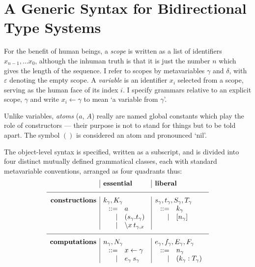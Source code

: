 \documentclass{jfp1}
\newcommand{\emp}{\varepsilon}
\begin{document}
\section{A Generic Syntax for Bidirectional Type Systems}

\newcommand{\from}{\leftarrow}
\newcommand{\la}[1]{\backslash #1\:}

For the benefit of human beings, a \emph{scope} is written as a list of identifiers $x_{n-1},\ldots x_0$, although the inhuman truth is that it is just the number $n$
which gives the length of the sequence. I refer to scopes by
metavariables $\gamma$ and $\delta$, with $\emp$ denoting the empty
scope. A \emph{variable} is an identifier $x_i$ selected from
a scope, serving as the human face of its index $i$. I specify grammars
relative to an explicit scope, $\gamma$ and write $x_i\from\gamma$ to
mean `a variable from $\gamma$'.

Unlike variables, \emph{atoms} ($a$, $A$) really are named global
constants which play the role of constructors --- their purpose is not
to stand for things but to be told apart. The symbol $()$ is
considered an atom and pronounced `nil'.

The object-level syntax is specified,
written as a subscript, and
is divided into four distinct mutually defined grammatical classes,
each with standard metavariable conventions,
arranged as four quadrants thus:
\[\begin{array}{r|l|l}
& \mbox{\bf essential} & \mbox{\bf liberal} \\
\hline
    \mbox{\bf constructions} & k_\gamma, K_\gamma & s_\gamma, t_\gamma, S_\gamma, T_\gamma \\
    & \;\begin{array}[t]{rl}
          ::= & a \\
          | & (s_\gamma.t_\gamma) \\
          | & \la xt_{\gamma,x}
        \end{array}
    & \;\begin{array}[t]{rl}
          ::= & k_\gamma \\
          | & [n_\gamma]
        \end{array}
    \\
    \hline
    \mbox{\bf computations} & n_\gamma, N_\gamma & e_\gamma, f_\gamma, E_\gamma, F_\gamma \\
    & \;\begin{array}[t]{rl}
          ::= & x\from\gamma \\
          | & e_\gamma\:s_\gamma 
        \end{array}
    & \;\begin{array}[t]{rl}
          ::= & n_\gamma \\
          | & (k_\gamma:T_\gamma) 
        \end{array}
    \\
\end{array}\]
\end{document}
